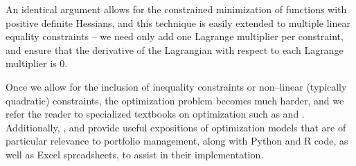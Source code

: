 \documentclass[graybox,envcountchap,sectrefs]{svmono}\usepackage[]{graphicx}\usepackage[]{xcolor}
\begin{document}
\begin{appendices}
An identical argument allows for the constrained minimization of functions
with positive definite Hessians, and this technique is easily extended
to multiple linear equality constraints -- we need only add one Lagrange
multiplier per constraint, and ensure that the derivative of the Lagrangian
with respect to each Lagrange multiplier is 0.

Once we allow for the inclusion of inequality constraints or non--linear
(typically quadratic) constraints, the optimization problem becomes
much harder, and we refer the reader to specialized textbooks on optimization
such as \citet{LuenbergerYe2008} and \citet{CornuejolsEtAl2018}.
Additionally, \citet{Kwan2007}, \citet{Kwan2018} and \citet{MarkowitzStarerFramGerber2020}
provide useful expositions of optimization models that are of particular
relevance to portfolio management, along with Python and R code, as
well as Excel spreadsheets, to assist in their implementation.

\end{appendices}

\pagebreak{}

\begin{flushleft}
\printbibliography
\par\end{flushleft}

\newpage
\end{document}
